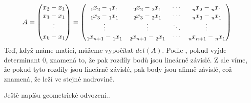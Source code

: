 \begingroup
\renewcommand*{\arraystretch}{1.25}
\delimitershortfall=0pt
\begin{equation*}
  A =
  \begin{pmatrix}
    x_2-x_1 \\
    x_3-x_1 \\
    \vdots  \\
    x_k-x_1
  \end{pmatrix}
  =
  \begin{pmatrix}
    \x{1}{2} - \x{1}{1} & \x{2}{2} - \x{2}{1} & \cdots & \x{n}{2} - \x{n}{1} \\
    \x{1}{3} - \x{1}{1} & \x{2}{3} - \x{2}{1} & \cdots & \x{n}{3} - \x{n}{1} \\
    \vdots        & \vdots        & \ddots & \vdots        \\
    \x{1}{n_+_1} - \x{1}{1} & \x{2}{n_+_1} - \x{2}{1} & \cdots & \x{n}{n_+_1} - \x{n}{1} \\
  \end{pmatrix}
\end{equation*}
\endgroup
Teď, když máme matici, můžeme vypočítat $det(A)$. Podle , pokud vyjde determinant $0$, znamená to, že pak rozdíly bodů jsou lineárně závislé. Z  ale víme, že pokud tyto rozdíly jsou lineárně závislé, pak body jsou afinně závislé, což znamená, že leží ve stejné nadrovině.  

Ještě napíšu geometrické odvození..